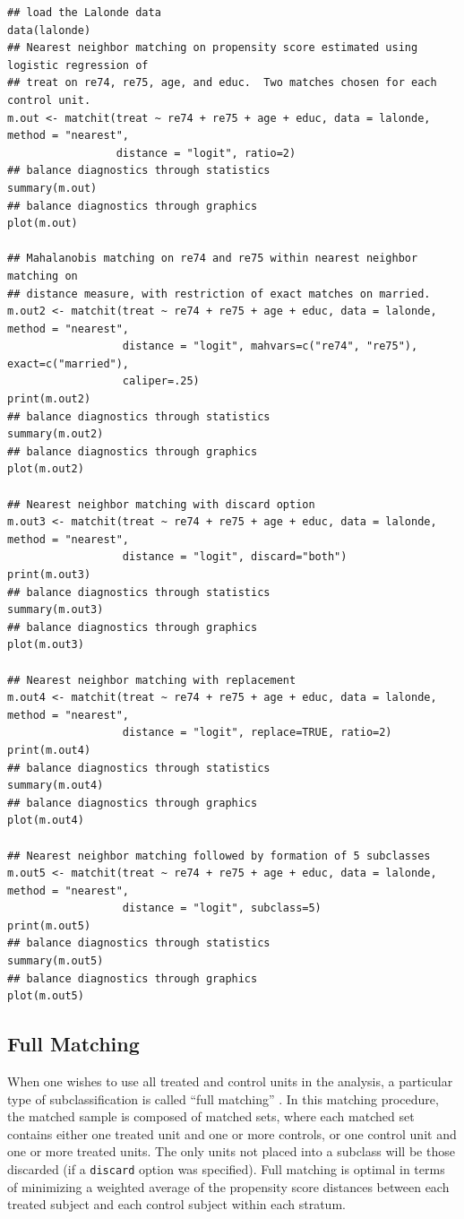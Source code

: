 \documentclass[oneside,letterpaper,titlepage]{article}
\begin{document}
\begin{verbatim}
## load the Lalonde data
data(lalonde)
## Nearest neighbor matching on propensity score estimated using logistic regression of
## treat on re74, re75, age, and educ.  Two matches chosen for each control unit.
m.out <- matchit(treat ~ re74 + re75 + age + educ, data = lalonde, method = "nearest", 
                 distance = "logit", ratio=2)
## balance diagnostics through statistics
summary(m.out)
## balance diagnostics through graphics
plot(m.out)

## Mahalanobis matching on re74 and re75 within nearest neighbor matching on 
## distance measure, with restriction of exact matches on married.
m.out2 <- matchit(treat ~ re74 + re75 + age + educ, data = lalonde, method = "nearest", 
                  distance = "logit", mahvars=c("re74", "re75"), exact=c("married"), 
                  caliper=.25)
print(m.out2)
## balance diagnostics through statistics
summary(m.out2)
## balance diagnostics through graphics
plot(m.out2)

## Nearest neighbor matching with discard option
m.out3 <- matchit(treat ~ re74 + re75 + age + educ, data = lalonde, method = "nearest", 
                  distance = "logit", discard="both")
print(m.out3)
## balance diagnostics through statistics
summary(m.out3)
## balance diagnostics through graphics
plot(m.out3)

## Nearest neighbor matching with replacement
m.out4 <- matchit(treat ~ re74 + re75 + age + educ, data = lalonde, method = "nearest", 
                  distance = "logit", replace=TRUE, ratio=2)
print(m.out4)
## balance diagnostics through statistics
summary(m.out4)
## balance diagnostics through graphics
plot(m.out4)

## Nearest neighbor matching followed by formation of 5 subclasses
m.out5 <- matchit(treat ~ re74 + re75 + age + educ, data = lalonde, method = "nearest", 
                  distance = "logit", subclass=5)
print(m.out5)
## balance diagnostics through statistics
summary(m.out5)
## balance diagnostics through graphics
plot(m.out5)
\end{verbatim}

\subsection{Full Matching}
\label{fullmatching}

When one wishes to use all treated and control units in the analysis,
a particular type of subclassification is called ``full matching''
\citep{Rosenbaum02, Hansen04}. In this matching procedure, the matched
sample is composed of matched sets, where each matched set contains
either one treated unit and one or more controls, or one control unit
and one or more treated units.  The only units not placed into a
subclass will be those discarded (if a \texttt{discard} option was
specified).  Full matching is optimal in terms of minimizing a
weighted average of the propensity score distances between each
treated subject and each control subject within each stratum.
\end{document}
